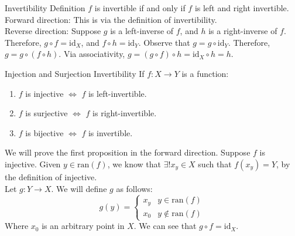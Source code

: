\documentclass[10pt]{extarticle}
\begin{document}
  \begin{problem}{Invertibility Definition}
    $f$ is invertible if and only if $f$ is left and right invertible.
    \tcblower
      Forward direction: This is via the definition of invertibility.\\

      Reverse direction: Suppose $g$ is a left-inverse of $f$, and $h$ is a right-inverse of $f$. Therefore, $g\circ f = \text{id}_X$, and $f\circ h = \text{id}_Y$. Observe that $g = g\circ \text{id}_Y$. Therefore, $g = g\circ(f\circ h)$. Via associativity, $g = (g\circ f)\circ h = \text{id}_X \circ h = h$.
  \end{problem}
  \begin{problem}{Injection and Surjection Invertibility}
    If $f:X\rightarrow Y$ is a function:
    \begin{enumerate}
      \item $f$ is injective $\Leftrightarrow$ $f$ is left-invertible.
      \item $f$ is surjective $\Leftrightarrow$ $f$ is right-invertible.
      \item $f$ is bijective $\Leftrightarrow$ $f$ is invertible.
    \end{enumerate}
    \tcblower
    We will prove the first proposition in the forward direction. Suppose $f$ is injective. Given $y\in \text{ran}(f)$, we know that $\exists! x_y\in X$ such that $f(x_y) = Y$, by the definition of injective.\\

    Let $g:Y\rightarrow X$. We will define $g$ as follows:
    \[
      g(y) = \begin{cases}
        x_y & y\in \text{ran}(f) \\
        x_0 & y\notin \text{ran}(f)
      \end{cases}
    \] 
    Where $x_0$ is an arbitrary point in $X$. We can see that $g\circ f = \text{id}_X$.
  \end{problem}
\end{document}
